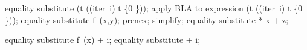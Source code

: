 
\begin{zproof}[test]
  equality substitute \dom (t \rres \dom ((iter~i) t \rres \{0 \}));
  apply BLA to expression \dom (t \rres \dom ((iter~i) t \rres \{0 \}));
  equality substitute f~(x,y);
	prenex;
	simplify;
	equality substitute  x + z;
\end{zproof}

\begin{zproof}[Test2]
  equality substitute \negate f~(x) + i;
  equality substitute  + i;
\end{zproof}